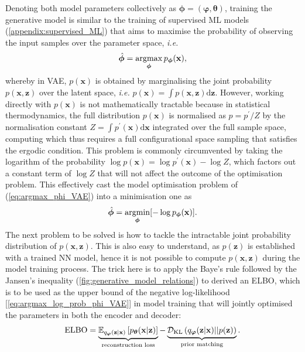 Denoting both model parameters collectively as $\boldsymbol{\phi}=(\boldsymbol{\varphi},\boldsymbol{\theta})$, training the generative model is similar to the training of supervised ML models (\cref{appendix:supervised_ML}) that aims to maximise the probability of observing the input samples over the parameter space, \emph{i.e.}
\begin{equation}
    \label{eq:argmax_phi_VAE}
    \hat{\boldsymbol{\phi}}=\operatorname*{argmax}_{\boldsymbol{\phi}}p_{\boldsymbol{\phi}}(\mathbf{x}),
\end{equation}
whereby in VAE, $p(\bm{x})$ is obtained by marginalising the joint probability $p(\bm{x},\bm{z})$ over the latent space, \emph{i.e.} $p(\bm{x})=\int p(\bm{x},\bm{z})\mathrm{d} \bm{z}$. However, working directly with $p(\bm{x})$ is not mathematically tractable because in statistical thermodynamics, the full distribution $p(\bm{x})$ is normalised as $p=p^\prime/Z$ by the normalisation constant $Z=\int p^\prime(\bm{x})\mathrm{d}\bm{x}$ integrated over the full sample space, computing which thus requires a full configurational space sampling that satisfies the ergodic condition. This problem is commonly circumvented by taking the logarithm of the probability $\log p(\bm{x})=\log p^\prime(\bm{x})-\log Z$, which factors out a constant term of $\log Z$ that will not affect the outcome of the optimisation problem.\cite{sohl2015deep} This effectively cast the model optimisation problem of (\ref{eq:argmax_phi_VAE}) into a minimisation one as
\begin{equation}
    \label{eq:argmax_log_prob_phi_VAE}
    \hat{\boldsymbol{\phi}}=\operatorname*{argmin}_{\boldsymbol{\phi}}[-\log p_{\boldsymbol{\phi}}(\mathbf{x})].
\end{equation}
The next problem to be solved is how to tackle the intractable joint probability distribution of $p(\bm{x},\bm{z})$. This is also easy to understand, as $p(\bm{z})$ is established with a trained NN model, hence it is not possible to compute $p(\bm{x},\bm{z})$ during the model training process. The trick here is to apply the Baye's rule followed by the Jansen's inequality (\cref{fig:generative_model_relations}) to derived an ELBO, which is to be used as the upper bound of the negative log-likelihood [\cref{eq:argmax_log_prob_phi_VAE}] in model training that will jointly optimised the parameters in both the encoder and decoder:\cite{luo2022understanding}
\begin{equation}
    \label{eq:VAE_ELBO}
    \mbox{ELBO}=\underbrace{ \mathbb{E}_{q_{\boldsymbol{\varphi}}(\mathbf{z}|\mathbf{x})}\left[p_{\boldsymbol{\theta}}(\mathbf{x}|\mathbf{z})\right]}_{\mbox{\scriptsize{reconstruction loss}}}
    -\underbrace{\mathcal{D}_{\mathrm{KL}}\left(  q_{\boldsymbol{\varphi}}(\mathbf{z}|\mathbf{x})||p(\mathbf{z}) \right)}_{\mbox{\scriptsize{prior matching}}}.
\end{equation}
